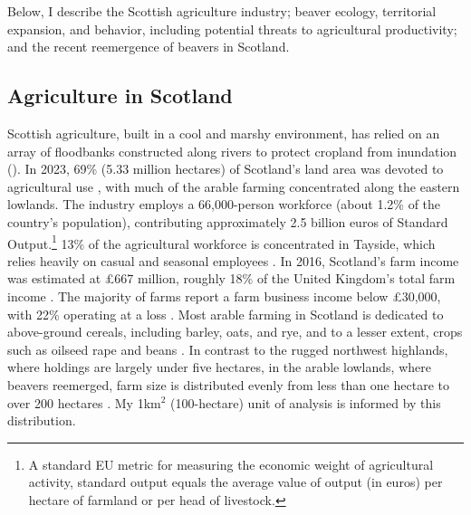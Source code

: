 
Below, I describe the Scottish agriculture industry; beaver ecology, territorial expansion, and behavior, including potential threats to agricultural productivity; and the recent reemergence of beavers in Scotland. 

\subsection{Agriculture in Scotland}
Scottish agriculture, built in a cool and marshy environment, has relied on an array of floodbanks constructed along rivers to protect cropland from inundation (\cite{goldfarb_eager_2018}). In 2023, 69\% (5.33 million hectares) of Scotland's land area was devoted to agricultural use \citep{cabinet_secretary_for_rural_affairs_land_reform_and_islands_results_2023}, with much of the arable farming concentrated along the eastern lowlands. The industry employs a 66,000-person workforce (about 1.2\% of the country's population), contributing approximately 2.5 billion euros of Standard Output.\footnote{A standard EU metric for measuring the economic weight of agricultural activity, standard output equals the average value of output (in euros) per hectare of farmland or per head of livestock.} 13\% of the agricultural workforce is concentrated in Tayside, which relies heavily on casual and seasonal employees \citep{noauthor_economic_2016}. In 2016, Scotland's farm income was estimated at \pounds 667 million, roughly 18\% of the United Kingdom's total farm income \citep{noauthor_economic_2016}. The majority of farms report a farm business income below \pounds 30,000, with 22\% operating at a loss \citep{noauthor_economic_2016}. Most arable farming in Scotland is dedicated to above-ground cereals, including barley, oats, and rye, and to a lesser extent, crops such as oilseed rape and beans \citep{cabinet_secretary_for_rural_affairs_land_reform_and_islands_results_2023}. In contrast to the rugged northwest highlands, where holdings are largely under five hectares, in the arable lowlands, where beavers reemerged, farm size is distributed evenly from less than one hectare to over 200 hectares \citep{noauthor_economic_2016}. My 1km$^2$ (100-hectare) unit of analysis is informed by this distribution.

